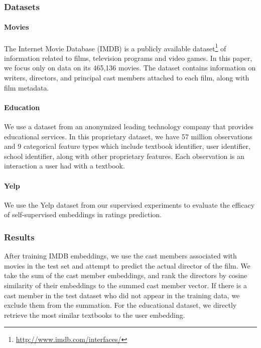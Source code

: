 \documentclass{article}
\begin{document}
\subsubsection{Datasets}

\paragraph{Movies}
The Internet Movie Database (IMDB) is a publicly available dataset\footnote{\href{http://www.imdb.com/interfaces/}{http://www.imdb.com/interfaces/}} of information related to films, television programs and video games.
In this paper, we focus only on data on its 465,136 movies.
The dataset contains information on writers, directors, and principal cast members attached to each film, along with film metadata.


\paragraph{Education}
We use a dataset from an anonymized leading technology company that provides educational services.
In this proprietary dataset, we have 57  million observations and 9 categorical feature types which include textbook identifier, user identifier, school identifier,
along with other proprietary features.
Each observation is an interaction a user had with a textbook.

\paragraph{Yelp}
We use the Yelp dataset from our supervised experiments to evaluate the efficacy of self-supervised embeddings in ratings prediction.







\subsubsection{Results}

After training IMDB embeddings, we use the cast members associated with movies in the test set and  attempt to predict the actual director of the film.
We take the sum of the cast member embeddings, and rank the directors by cosine similarity of their embeddings to the summed cast member vector.
If there is a cast member in the test dataset who did not appear in the training data, we exclude them from the summation.
For the educational dataset, we directly  retrieve the most similar textbooks to the user embedding.
\end{document}

